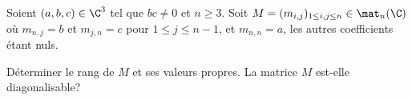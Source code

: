 \begin{enonce}
\begin{exercise}[ID={RMS125 E955, CCP MP},subtitle={2014 CCP MP},tags={}, difficulty={0}]
Soient $(a,b,c)\in\C^3$ tel que $bc\neq0$ et $n\geq3$.
Soit $M=(m_{i,j})_{1\leq i,j\leq n}\in\mat_n(\C)$
où $m_{n,j}=b$ et $m_{j,n}=c$ pour $1\leq j \leq n-1$, et $m_{n,n}=a$,
les autres coefficients étant nuls.

Déterminer le rang de $M$ et ses valeurs propres.
La matrice $M$ est-elle diagonalisable?
\end{exercise}
\begin{solution}
\end{solution}
\end{enonce}
